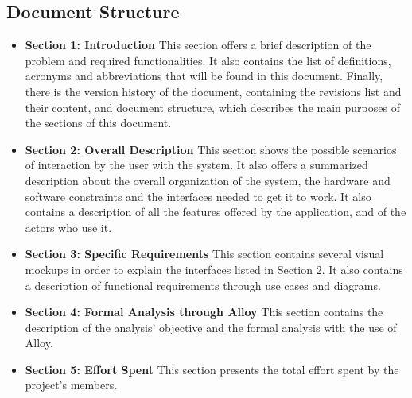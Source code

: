 \subsection{Document Structure}
\begin{itemize}
        \item \textbf{Section 1: Introduction} This section offers a brief description of the problem and required functionalities.
        It also contains the list of definitions, acronyms and abbreviations that will be found in this document.
        Finally, there is the version history of the document, containing the revisions list and their content, and document structure, 
        which describes the main purposes of the sections of this document.
        \item \textbf{Section 2: Overall Description} This section shows the possible scenarios of interaction by the user with the system. It also offers a summarized description about the overall organization of the system, the hardware and software constraints and the interfaces needed to get it to work.
        It also contains a description of all the features offered by the application, and of the actors who use it.
        
        \item \textbf{Section 3: Specific Requirements} This section contains several visual mockups in order to explain the interfaces listed in Section 2. 
        It also contains a description of functional requirements through use cases and diagrams.

        \item \textbf{Section 4: Formal Analysis through Alloy} This section contains the description of the analysis' objective and the formal analysis with the use of Alloy.
        \item \textbf{Section 5: Effort Spent} This section presents the total effort spent by the project's members.
\end{itemize}
